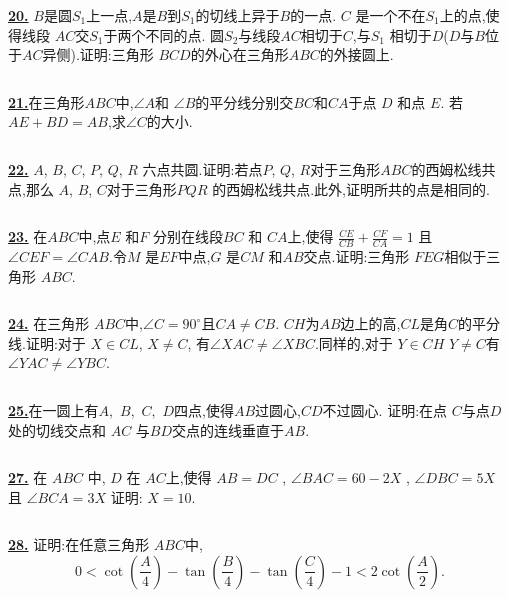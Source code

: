 \documentclass{article}
\begin{document}
$$ $$

\href{http://www.artofproblemsolving.com/Forum/viewtopic.php?p=118667#p118667}{\bf 20.} $B$是圆$S_1$上一点,$A$是$B$到$S_1$的切线上异于$B$的一点. $C$ 是一个不在$S_1$上的点,使得线段 $AC$交$S_1$于两个不同的点. 圆$S_2$与线段$AC$相切于$C$,与$S_1$ 相切于$D$($D$与$B$位于$AC$异侧).证明:三角形 $BCD$的外心在三角形$ABC$的外接圆上.

$$ $$

\href{http://www.artofproblemsolving.com/Forum/viewtopic.php?p=2126712#p2126712}{\bf 21.}在三角形$ABC$中,$\angle A$和 $\angle B$的平分线分别交$BC$和$CA$于点 $D$ 和点 $E$. 若$AE+BD=AB$,求$\angle C$的大小.

$$ $$

\href{http://www.artofproblemsolving.com/Forum/viewtopic.php?p=2117909#p2117909}{\bf 22.} $A$, $B$, $C$, $P$, $Q$, $R$ 六点共圆.证明:若点$P$, $Q$, $R$对于三角形$ABC$的西姆松线共点,那么 $A$, $B$, $C$对于三角形$PQR$ 的西姆松线共点.此外,证明所共的点是相同的.

$$ $$

\href{http://www.artofproblemsolving.com/Forum/viewtopic.php?p=2114602#p2114602}{\bf 23.} 在$ABC$中,点$E$ 和$F$ 分别在线段$BC$ 和 $CA$上,使得 $\displaystyle\frac{CE}{CB}+\frac{CF}{CA}=1$ 且 $\angle CEF=\angle CAB$.令$M$ 是$EF$中点,$G$ 是$CM$ 和$AB$交点.证明:三角形 $FEG$相似于三角形 $ABC$.

$$ $$

\href{http://www.artofproblemsolving.com/Forum/viewtopic.php?p=358032#p358032}{\bf 24.} 在三角形 $ABC$中,$\angle C = 90^\circ$且$CA \neq CB$.  $CH$为$AB$边上的高,$CL$是角$C$的平分线.证明:对于 $X \in CL$, $X \neq C$, 有$\angle XAC \neq \angle XBC$.同样的,对于 $Y \in CH$ $Y\neq C$有 $\angle YAC \neq \angle YBC$.

$$ $$

\href{http://www.artofproblemsolving.com/Forum/viewtopic.php?p=113332#p113332}{\bf 25.}在一圆上有$A,$ $B,$ $C,$ $D$四点,使得$AB$过圆心,$CD$不过圆心. 证明:在点 $C$与点$D$处的切线交点和 $AC$ 与$BD$交点的连线垂直于$AB.$

$$ $$

\href{http://www.artofproblemsolving.com/Forum/viewtopic.php?p=1992097#p1992097
 }{\bf 27.} 在 $ABC$ 中, $D$ 在 $AC$上,使得 $AB=DC$ , $\angle BAC=60-2X$ , $\angle DBC=5X$ 且 $\angle BCA=3X$
证明: $X=10.$


$$ $$

\href{http://www.artofproblemsolving.com/Forum/viewtopic.php?p=333377#p333377
 }{\bf 28.} 证明:在任意三角形 $ABC$中,
$$0 < \cot { \left( \frac{A}{4} \right)} - \tan{ \left( \frac{B}{4} \right) } - \tan{ \left( \frac{C}{4} \right) } - 1 < 2 \cot { \left( \frac{A}{2} \right) }.  $$
\end{document}
